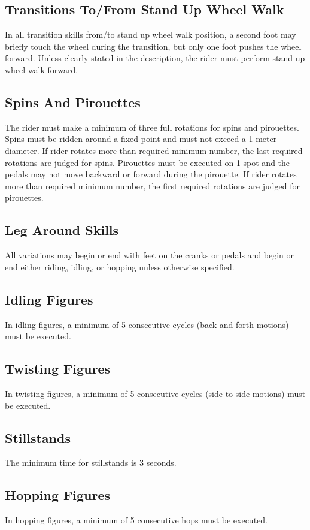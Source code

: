\subsection{Transitions To/From Stand Up Wheel Walk}
In all transition skills from/to stand up wheel walk position, a second foot may briefly touch the wheel during the transition, but only one foot pushes the wheel forward.
Unless clearly stated in the description, the rider must perform stand up wheel walk forward.

\subsection{Spins And Pirouettes}
The rider must make a minimum of three full rotations for spins and pirouettes.
Spins must be ridden around a fixed point and must not exceed a 1 meter diameter.
If rider rotates more than required minimum number, the last required rotations are judged for spins.
Pirouettes must be executed on 1 spot and the pedals may not move backward or forward during the pirouette.
If rider rotates more than required minimum number, the first required rotations are judged for pirouettes.

\subsection{Leg Around Skills}
All variations may begin or end with feet on the cranks or pedals and begin or end either riding, idling, or hopping unless otherwise specified.

\subsection{Idling Figures}
In idling figures, a minimum of 5 consecutive cycles (back and forth motions) must be executed.

\subsection{Twisting Figures}
In twisting figures, a minimum of 5 consecutive cycles (side to side motions) must be executed.

\subsection{Stillstands}
The minimum time for stillstands is 3 seconds.

\subsection{Hopping Figures}
In hopping figures, a minimum of 5 consecutive hops must be executed.

